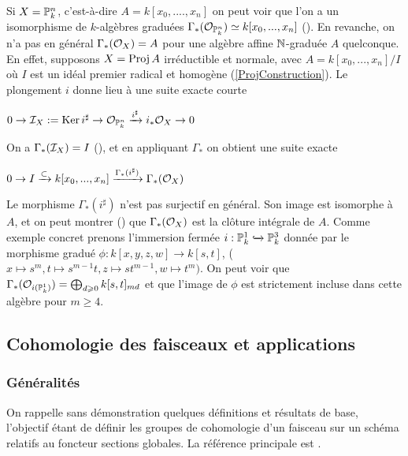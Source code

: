\begin{rem}
Si $X=\mathbb{P}_k^n$, c'est-à-dire $A=k[x_0,....,x_n]$ on peut voir que l'on a un isomorphisme de $k$-algèbres graduées $\Gamma_*(\mathcal{O}_{\mathbb{P}_k^n})\simeq k[x_0,...,x_n]$ (\cite[II.5.13]{Hartshorne}). En revanche, on n'a pas en général $\Gamma_*(\mathcal{O}_X)=A$ pour une algèbre affine $\mathbb{N}$-graduée $A$ quelconque. En effet, supposons $X=\operatorname{Proj} A$ irréductible et normale, avec $A=k[x_0,...,x_n]/I$ où $I$ est un idéal premier radical et homogène (\ref{ProjConstruction}). Le plongement $i$ donne lieu à une suite exacte courte
\begin{center}
$0\rightarrow\mathcal{I}_X:=\operatorname{Ker} i^\sharp\rightarrow\mathcal{O}_{\mathbb{P}_k^n}\xrightarrow{i^\sharp}i_*\mathcal{O}_X\rightarrow 0$
\end{center}
On a $\Gamma_*(\mathcal{I}_X)=I$ (\cite[ex II.5.10]{Hartshorne}), et en appliquant $\Gamma_*$ on obtient une suite exacte
\begin{center}
$0\rightarrow I \xrightarrow{\subset} k[x_0,...,x_n]\xrightarrow{\Gamma_*(i^\sharp)}\Gamma_*(\mathcal{O}_X)$
\end{center}

Le morphisme $\Gamma_*(i^\sharp)$ n'est pas surjectif en général. Son image est isomorphe à $A$, et on peut montrer (\cite[II ex 5.14]{Hartshorne}) que $\Gamma_*(\mathcal{O}_X)$ est la clôture intégrale de $A$. Comme exemple concret prenons l'immersion fermée $i:\mathbb{P}_k^1\xhookrightarrow{}\mathbb{P}_k^3$ donnée par le morphisme gradué $\phi:k[x,y,z,w]\rightarrow k[s,t]$, ($x\mapsto s^m, t\mapsto s^{m-1}t, z\mapsto st^{m-1},w\mapsto t^m)$. On peut voir que $\Gamma_*(\mathcal{O}_{i(\mathbb{P}_k^1)})=\bigoplus_{d\geqslant 0}k[s,t]_{md}$ et que l'image de $\phi$ est strictement incluse dans cette algèbre pour $m\geq 4$.

\end{rem}

\subsection{Cohomologie des faisceaux et applications}
\label{Cohomologie}
\subsubsection{Généralités}

On rappelle sans démonstration quelques définitions et résultats de base, l'objectif étant de définir les groupes de cohomologie d'un faisceau sur un schéma relatifs au foncteur sections globales. La référence principale est \cite[chap III]{Hartshorne}.\\

